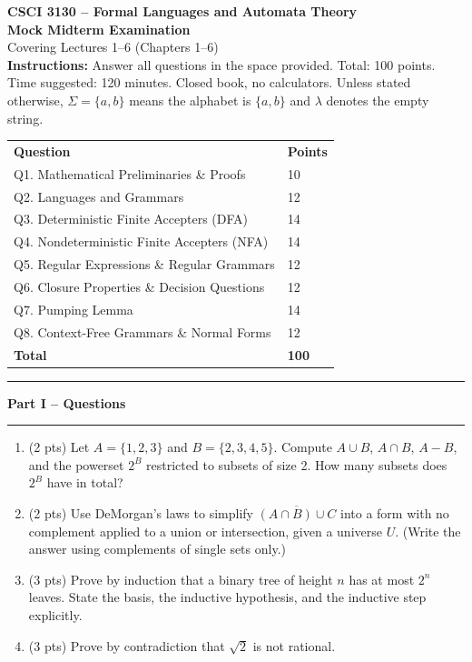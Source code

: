 \documentclass[11pt,a4paper]{article}
\newcounter{prob}
\newenvironment{problem}[1][]{%
  \refstepcounter{prob}%
  \begin{tcolorbox}[enhanced,breakable,colback=white,colframe=SteelBlue!70!black,
      boxrule=0.8pt,arc=1.5mm,left=5pt,right=5pt,top=3pt,bottom=3pt,
      before skip=8pt,after skip=8pt,
      title={\textbf{Question \theprob\ (#1)}},fonttitle=\bfseries, coltitle=white,
      colbacktitle=SteelBlue!70!black, boxed title style={arc=1mm}]}
{\end{tcolorbox}}
\begin{document}
\begin{center}
  {\LARGE\bfseries CSCI 3130 -- Formal Languages and Automata Theory}\\[2mm]
  {\large\bfseries Mock Midterm Examination}\\[1mm]
  {\normalsize Covering Lectures 1--6 (Chapters 1--6)} \\[2mm]
  {\small \textbf{Instructions:} Answer all questions in the space provided.
  Total: 100 points. Time suggested: 120 minutes. Closed book, no calculators.
  Unless stated otherwise, $\Sigma=\{a,b\}$ means the alphabet is $\{a,b\}$ and
  $\lambda$ denotes the empty string.}\\[4mm]
  \begin{tabular}{@{}ll@{}}
    \textbf{Question} & \textbf{Points}\\
    Q1. Mathematical Preliminaries \& Proofs & 10 \\
    Q2. Languages and Grammars & 12 \\
    Q3. Deterministic Finite Accepters (DFA) & 14 \\
    Q4. Nondeterministic Finite Accepters (NFA) & 14 \\
    Q5. Regular Expressions \& Regular Grammars & 12 \\
    Q6. Closure Properties \& Decision Questions & 12 \\
    Q7. Pumping Lemma & 14 \\
    Q8. Context-Free Grammars \& Normal Forms & 12 \\
    \hline
    \textbf{Total} & \textbf{100}\\
  \end{tabular}
\end{center}

\vspace{2mm}
\noindent\rule{\linewidth}{0.6pt}
\vspace{1mm}
{\color{SteelBlue}\bfseries\large Part I -- Questions}\\[2mm]
\noindent\rule{\linewidth}{0.6pt}

\begin{problem}[Mathematical Preliminaries and Proofs -- 10 points]
\begin{enumerate}[label=(\alph*)]
  \item (2 pts) Let $A=\{1,2,3\}$ and $B=\{2,3,4,5\}$. Compute
  $A\cup B$, $A\cap B$, $A-B$, and the powerset $2^B$ restricted to
  subsets of size 2. How many subsets does $2^B$ have in total?
  \item (2 pts) Use DeMorgan's laws to simplify
  $\overline{(A\cap B)\cup C}$ into a form with no complement applied
  to a union or intersection, given a universe $U$. (Write the answer
  using complements of single sets only.)
  \item (3 pts) Prove by induction that a binary tree of height $n$
  has at most $2^n$ leaves. State the basis, the inductive hypothesis,
  and the inductive step explicitly.
  \item (3 pts) Prove by contradiction that $\sqrt{2}$ is not rational.
\end{enumerate}
\end{problem}
\end{document}
